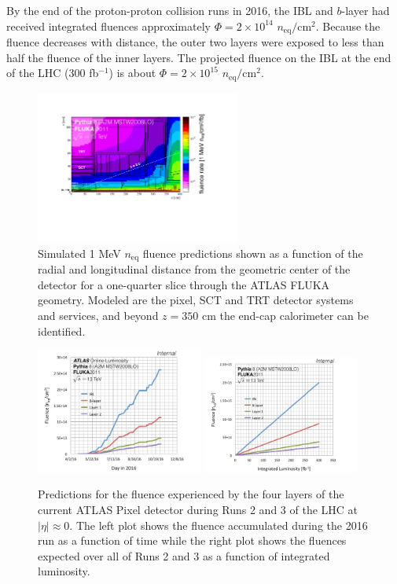 By the end of the proton-proton collision runs in 2016, the IBL and $b$-layer had received integrated 
fluences approximately $\Phi=2\times 10^{14}$ $n_\text{eq}/\text{cm}^{2}$. Because the fluence 
decreases with distance, the outer two layers were exposed to less than half the fluence of the inner 
layers. The projected fluence on the IBL at the end of the LHC (300 fb$^{-1}$) is about 
$\Phi=2\times 10^{15}$ $n_\text{eq}/\text{cm}^{2}$. 

\begin{figure}[htpb!]
\centering
\includegraphics[width=0.6\textwidth]{Labeled2.pdf}
\caption{Simulated 1 MeV $n_\text{eq}$ fluence predictions shown as a function of the radial and longitudinal distance from the geometric center of the detector for a one-quarter slice through the ATLAS FLUKA geometry. Modeled are the pixel, SCT and TRT detector systems and services, and beyond $z = 350$ cm the end-cap calorimeter can be identified.}
\label{fig:fluenceoverview2}
\end{figure}

\begin{figure}[htpb!]
\centering
\includegraphics[width=0.49\textwidth]{Fluence_2016}
\includegraphics[width=0.46\textwidth]{Fluence_Run23.pdf}
\caption{Predictions for the fluence experienced by the four layers of the current ATLAS Pixel detector during Runs 2 and 3 of the LHC at $|\eta|\approx 0$.  The left plot shows the fluence accumulated during the 2016 run as a function of time while the right plot shows the fluences expected over all of Runs 2 and 3 as a function of integrated luminosity.}
\label{fig:fluenceoverview}
\end{figure}
  



